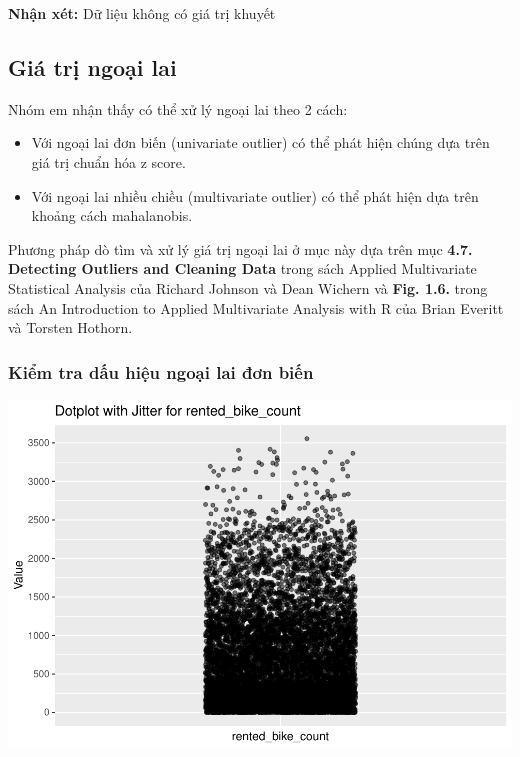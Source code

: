 \documentclass[
  11pt,
  letterpaper,
]{article}
\begin{document}
\textbf{Nhận xét:} Dữ liệu không có giá trị khuyết

\subsection{Giá trị ngoại lai}

Nhóm em nhận thấy có thể xử lý ngoại lai theo 2 cách:

\begin{itemize}
\item Với ngoại lai đơn biến (univariate outlier) có thể phát hiện chúng dựa trên giá trị chuẩn hóa z score.
\item Với ngoại lai nhiều chiều (multivariate outlier) có thể phát hiện dựa trên khoảng cách mahalanobis.
\end{itemize}

Phương pháp dò tìm và xử lý giá trị ngoại lai ở mục này dựa trên mục \textbf{4.7. Detecting Outliers and Cleaning Data} trong sách Applied Multivariate Statistical Analysis của Richard Johnson và Dean Wichern và \textbf{Fig. 1.6.} trong sách An Introduction to Applied Multivariate Analysis with R của Brian Everitt và Torsten Hothorn.

\subsubsection{Kiểm tra dấu hiệu ngoại lai đơn biến}

\begin{center}\includegraphics[width=1.2\linewidth,]{Final_Project_files/figure-latex/Univariate Outlier Check-1} \end{center}
\end{document}
